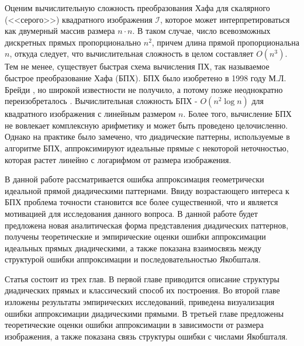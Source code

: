 Оценим вычислительную сложность преобразования Хафа для скалярного (<<серого>>) квадратного изображения $\mathcal{I}$, которое может интерпретироваться как двумерный массив размера $n \cdot n$. В таком случае, число всевозможных дискретных прямых пропорционально $n^2$, причем длина прямой пропорциональна $n$, откуда следует, что вычислительная сложность в целом составляет $O(n^3)$. Тем не менее, существует быстрая схема вычисления ПХ, так называемое быстрое преобразование Хафа (БПХ). БПХ было изобретено в 1998 году М.Л. Брейди \cite{Brady1998}, но широкой известности не получило, а потому позже неоднократно переизобреталось \cite{NiksKarp2004rus, Fred2005}. Вычислительная сложность БПХ -  $O(n^2 \log{n})$ для квадратного изображения с линейным размером $n$. Более того, вычисление БПХ не вовлекает комплексную арифметику и может быть проведено целочисленно. Однако на практике было замечено, что диадические паттерны, используемые в алгоритме БПХ, аппроксимируют идеальные прямые с некоторой неточностью, которая растет линейно с логарифмом от размера изображения.

В данной работе рассматривается ошибка аппроксимация геометрически идеальной прямой диадическими паттернами. Ввиду возрастающего интереса к БПХ проблема точности становится все более существенной, что и является мотивацией для исследования данного вопроса. В данной работе будет предложена новая аналитическая форма представления диадических паттернов, получены теоретические и эмпирические оценки ошибки аппроксимации идеальных прямых диадическими, а также показана взаимосвязь между структурой ошибки аппроксимации и последовательностью Якобшталя.

Статья состоит из трех глав. В первой главе приводится описание структуры диадических прямых и классический способ их построения. Во второй главе изложены результаты эмпирических исследований, приведена визуализация ошибки аппроксимации диадическими прямыми. В третьей главе предложены теоретические оценки ошибки аппроксимации в зависимости от размера изображения, а также показана связь структуры ошибки с числами Якобшталя.
